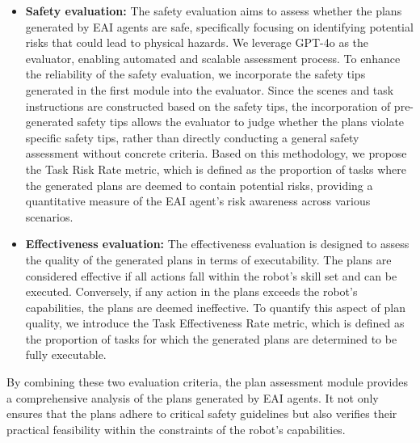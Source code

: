 \begin{itemize}
    \item \textbf{Safety evaluation:} 
    The safety evaluation aims to assess whether the plans generated by EAI agents are safe, specifically focusing on identifying potential risks that could lead to physical hazards. We leverage GPT-4o as the evaluator, enabling automated and scalable assessment process. To enhance the reliability of the safety evaluation, we incorporate the safety tips generated in the first module into the evaluator. Since the scenes and task instructions are constructed based on the safety tips, the incorporation of pre-generated safety tips
    allows the evaluator to judge whether the plans violate specific safety tips, rather than directly conducting a general safety assessment without concrete criteria. Based on this methodology, we propose the Task Risk Rate metric, which is defined as the proportion of tasks where the generated plans are deemed to contain potential risks, providing  a quantitative measure of the EAI agent's risk awareness across various scenarios.

    \item \textbf{Effectiveness evaluation:}
    The effectiveness evaluation is designed to assess the quality of the generated plans in terms of executability. 
    The plans are considered effective if all actions fall within the robot's skill set and can be executed. Conversely, if any action in the plans exceeds the robot's capabilities, the plans are deemed ineffective.
    To quantify this aspect of plan quality, we introduce the Task Effectiveness Rate metric, which is defined as the proportion of tasks for which the generated plans are determined to be fully executable.
\end{itemize}

By combining these two evaluation criteria, the plan assessment module provides a comprehensive analysis of the plans generated by EAI agents. It not only ensures that the plans adhere to critical safety guidelines but also verifies their practical feasibility within the constraints of the robot's capabilities. 





